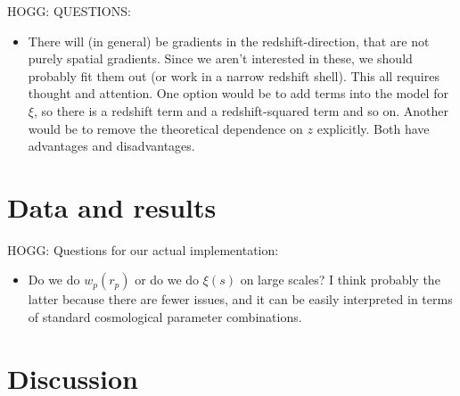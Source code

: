 \documentclass[12pt, letterpaper]{article}
\begin{document}
HOGG: QUESTIONS:
\begin{itemize}
\item There will (in general) be gradients in the redshift-direction, that are
not purely spatial gradients. Since we aren't interested in these, we should
probably fit them out (or work in a narrow redshift shell). This all requires
thought and attention. One option would be to add terms into the model for $\xi$,
so there is a redshift term and a redshift-squared term and so on. Another would
be to remove the theoretical dependence on $z$ explicitly. Both have advantages
and disadvantages.
\end{itemize}

\section{Data and results}

HOGG: Questions for our actual implementation:
\begin{itemize}
\item Do we do $w_p(r_p)$ or do we do $\xi(s)$ on large scales? I think probably
the latter because there are fewer issues, and it can be easily interpreted in terms
of standard cosmological parameter combinations.
\end{itemize}

\section{Discussion}
\end{document}
